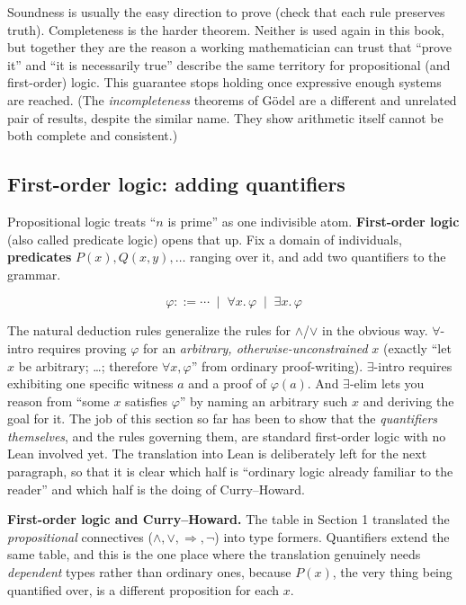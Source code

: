 Soundness is usually the easy direction to prove (check that each rule preserves truth). Completeness is the harder theorem. Neither is used again in this book, but together they are the reason a working mathematician can trust that ``prove it'' and ``it is necessarily true'' describe the same territory for propositional (and first-order) logic. This guarantee stops holding once expressive enough systems are reached. (The \emph{incompleteness} theorems of Gödel are a different and unrelated pair of results, despite the similar name. They show arithmetic itself cannot be both complete and consistent.)

\subsection{First-order logic: adding quantifiers}\label{sec:03-propositions-and-proofs:02-logic-recap:6}

Propositional logic treats ``\(n\) is prime'' as one indivisible atom. \textbf{First-order logic} (also called predicate logic) opens that up. Fix a domain of individuals, \textbf{predicates} \(P(x), Q(x, y), \dots\) ranging over it, and add two quantifiers to the grammar.

\[
\varphi ::= \cdots \;\mid\; \forall x.\, \varphi \;\mid\; \exists x.\, \varphi
\]

The natural deduction rules generalize the rules for \(\wedge\)/\(\vee\) in the obvious way. \(\forall\)-intro requires proving \(\varphi\) for an \emph{arbitrary, otherwise-unconstrained} \(x\) (exactly ``let \(x\) be arbitrary; \ldots; therefore \(\forall x, \varphi\)'' from ordinary proof-writing). \(\exists\)-intro requires exhibiting one specific witness \(a\) and a proof of \(\varphi(a)\). And \(\exists\)-elim lets you reason from ``some \(x\) satisfies \(\varphi\)'' by naming an arbitrary such \(x\) and deriving the goal for it. The job of this section so far has been to show that the \emph{quantifiers themselves}, and the rules governing them, are standard first-order logic with no Lean involved yet. The translation into Lean is deliberately left for the next paragraph, so that it is clear which half is ``ordinary logic already familiar to the reader'' and which half is the doing of Curry--Howard.

\textbf{First-order logic and Curry--Howard.} The table in Section 1 translated the \emph{propositional} connectives (\(\wedge, \vee, \Rightarrow, \neg\)) into type formers. Quantifiers extend the same table, and this is the one place where the translation genuinely needs \emph{dependent} types rather than ordinary ones, because \(P(x)\), the very thing being quantified over, is a different proposition for each \(x\).

